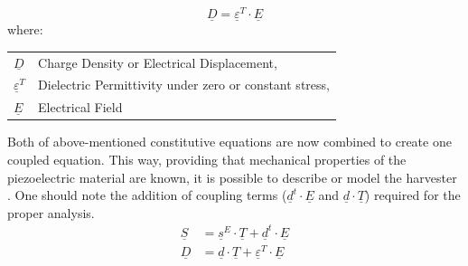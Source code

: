 \documentclass[12pt,a4paper]{article}
\makeatletter
\newenvironment{conditions}
  {\par\vspace{\abovedisplayskip}\noindent\begin{tabular}{>{$}l<{$} @{${}-{}$} l}}
  {\end{tabular}\par\vspace{\belowdisplayskip}}
\makeatother
\begin{document}
\begin{equation}
	\underline{D} = \underline{\varepsilon}^T \cdot \underline{E}
	\label{eqn:dielectrics}
\end{equation}
where:
\begin{conditions}
	\underline{D}     &  Charge Density or Electrical Displacement, \\
 	\underline{\varepsilon}^T    &  Dielectric Permittivity under zero or constant stress, \\   
 	\underline{E} &  Electrical Field	
\end{conditions}
Both of above-mentioned constitutive equations are now combined to create one coupled equation. This way, providing that mechanical properties of the piezoelectric material are known, it is possible to describe or model the harvester \cite{piezomath}. One should note the addition of coupling terms ($\underline{d}^t \cdot \underline{E}$ and $\underline{d} \cdot \underline{T}$) required for the proper analysis.
\begin{equation}
\label{eq:coupled}
\begin{aligned}
	\underline{S} &= \underline{s}^E \cdot \underline{T} + \underline{d}^t \cdot \underline{E}\\
	\underline{D} &= \underline{d} \cdot \underline{T} + \underline{\varepsilon}^T \cdot \underline{E}
\end{aligned}
\end{equation}
\end{document}
